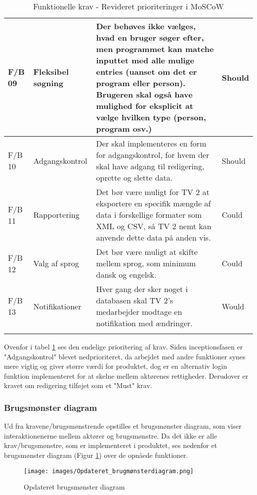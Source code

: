 \begin{longtable}{|p{10mm}|p{40mm}|p{70mm}|p{20mm}|}
    \hline
    F/B 09 & Fleksibel søgning & Der behøves ikke vælges, hvad en bruger søger efter, men programmet kan matche inputtet med alle mulige entries (uanset om det er program eller person). Brugeren skal også have mulighed for eksplicit at vælge hvilken type (person, program osv.) & Should \\
    \hline
    F/B 10 & Adgangskontrol & Der skal implementeres en form for adgangskontrol, for hvem der skal have adgang til redigering, oprette og slette data. & Should \\
    \hline
    F/B 11 & Rapportering & Det bør være muligt for TV 2 at eksportere en specifik  mængde af data i forskellige formater som XML og CSV, så TV 2 nemt kan anvende dette data på anden vis. & Could \\
    \hline
    F/B 12 & Valg af sprog & Det bør være muligt at skifte mellem sprog, som minimum dansk og engelsk. & Could \\\hline
    F/B 13 & Notifikationer & Hver gang der sker noget i databasen skal TV 2's medarbejder modtage en notifikation med ændringer. & Would \\
    \hline
    \caption{Funktionelle krav - Revideret prioriteringer i MoSCoW}
    \label{tab:FuncMoscow}
\end{longtable}

Ovenfor i tabel \ref{tab:FuncMoscow} ses den endelige prioritering af krav. Siden inceptionsfasen er "Adgangskontrol" blevet nedprioriteret, da arbejdet med andre funktioner synes mere vigtig og giver større værdi for produktet, dog er en alternativ login funktion implementeret for at skelne mellem aktørenes rettigheder. Derudover er kravet om redigering tilføjet som et "Must" krav.

\subsubsection{Brugsmønster diagram}
Ud fra kravene/brugsmønstrende opstilles et brugsmønster diagram, som viser interaktionenerne mellem aktører og brugsmønstre. Da det ikke er alle krav/brugsmønstre, som er implementeret i produktet, ses nedenfor et brugsmønster diagram (Figur \ref{fig:brugsmønster}) over de opnåede funktioner. 

\begin{figure}[H]
    \centering
\texttt{[image: images/Opdateret\_brugmønsterdiagram.png]}
    \caption{Opdateret brugsmønster diagram}
    \label{fig:brugsmønster}
\end{figure}

